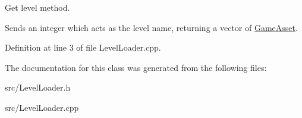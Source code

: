 Get level method. 

Sends an integer which acts as the level name, returning a vector of \hyperlink{classGameAsset}{Game\-Asset}. 

Definition at line 3 of file Level\-Loader.\-cpp.



The documentation for this class was generated from the following files\-:\begin{DoxyCompactItemize}
\item 
src/Level\-Loader.\-h\item 
src/Level\-Loader.\-cpp\end{DoxyCompactItemize}

